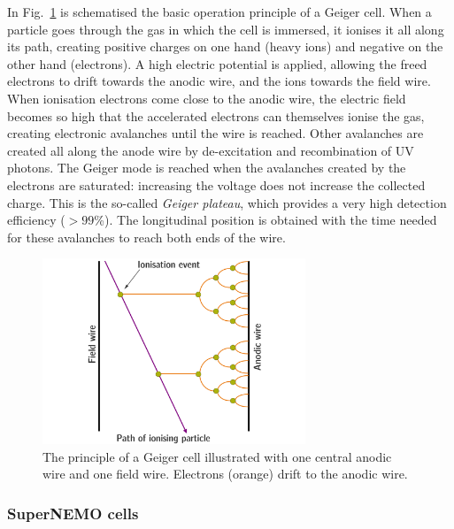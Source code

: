 In Fig.~\ref{fig:geiger_avalanche} is schematised the basic operation principle of a Geiger cell.
When a particle goes through the gas in which the cell is immersed, it ionises it all along its path, creating positive charges on one hand (heavy ions) and negative on the other hand (electrons).
A high electric potential is applied, allowing the freed electrons to drift towards the anodic wire, and the ions towards the field wire.
When ionisation electrons come close to the anodic wire, the electric field becomes so high that the accelerated electrons can themselves ionise the gas, creating electronic avalanches until the wire is reached.
Other avalanches are created all along the anode wire by de-excitation and recombination of UV photons.
The Geiger mode is reached when the avalanches created by the electrons are saturated: increasing the voltage does not increase the collected charge.
This is the so-called \emph{Geiger plateau}, which provides a very high detection efficiency ($>99$\%).
The longitudinal position is obtained with the time needed for these avalanches to reach both ends of the wire.
\begin{figure}[h!]
\centering
\includegraphics[width=0.7\textwidth]{SNdemonstrator/fig_SNdemonstrator/geiger_avalanche.pdf}
\caption{The principle of a Geiger cell illustrated with one central anodic wire and one field wire.
  Electrons (orange) drift to the anodic wire.
\label{fig:geiger_avalanche}}
\end{figure}


\subsubsection*{SuperNEMO cells}

